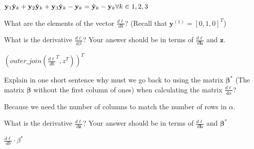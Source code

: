 \documentclass[11pt]{exam}
\numberwithin{equation}{section} %
\numberwithin{figure}{section} %
\numberwithin{table}{section} %
\newcommand{\bv}{\mathbf{b}}
\newcommand{\yv}{\mathbf{y}}
\newcommand{\zv}{\mathbf{z}}
\newcommand{\betav      }{\boldsymbol \beta      }
\begin{document}
\begin{enumerate}
\begin{questions}
	        
	        \begin{tcolorbox}[fit,height=1cm, width=6cm, blank, borderline={1pt}{-2pt}]
			$ \yv_1 \hat{\yv}_k + \yv_2 \hat{\yv}_k + \yv_3 \hat{\yv}_k - \yv_k 
			\\ = \hat{\yv}_k - \yv_k \forall k \in {1,2,3}$
	        \end{tcolorbox}
	        
	        
	        \question[2] What are the elements of the vector $\frac{d\ell}{db}$? (Recall that  $\yv^{(1)}=[0,1,0]^T$)
	        
	        
	        \begin{tcolorbox}[fit,height=1cm, width=6cm, blank, borderline={1pt}{-2pt}]
			[ $\hat{\yv}_1 - \yv_1 $, $\hat{\yv}_2 - \yv_2 $, $\hat{\yv}_3 - \yv_3 $]
	        \end{tcolorbox}
	        
	        
	        
	        \question[1] What is the derivative $\frac{d\ell}{d\beta}$? Your answer should be in terms of $\frac{d\ell}{d\bv}$ and $\zv$.
	        
	        
	        \begin{tcolorbox}[fit,height=3cm, width=6cm, blank, borderline={1pt}{-2pt}]
			$(outer\_join(\frac{d\ell}{db}^T, z^T))^T$
		\end{tcolorbox}
	        
	        
	        
	        
	        \question[1] Explain in one short sentence why must we go back to using the matrix $\betav^*$ (The matrix $\betav$ without the first column of ones) when calculating the matrix $\frac{d\ell}{d\alpha}$?
	        
	        
	        \begin{tcolorbox}[fit,height=1cm, width=15cm, blank, borderline={1pt}{-2pt}]
			Because we need the number of columns to match the number of rows in $\alpha$.
	        \end{tcolorbox}
	        
	        
	        
	        
	        \question[1] What is the derivative $\frac{d\ell}{d\zv}$? Your answer should be in terms of $\frac{d\ell}{d\bv}$ and $\betav^*$
	        
	        
	        \begin{tcolorbox}[fit,height=3cm, width=6cm, blank, borderline={1pt}{-2pt}]
			$\frac{d\ell}{db} \cdot \beta^* $
	        \end{tcolorbox}
	        

\end{questions}
\end{enumerate}
\end{document}
